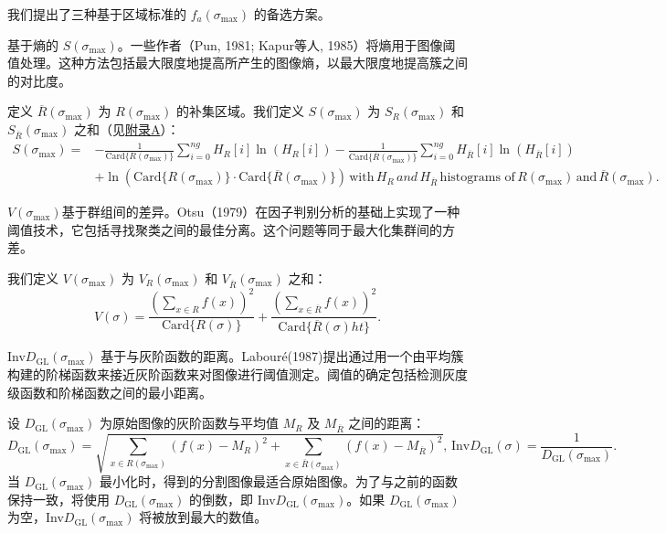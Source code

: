 我们提出了三种基于区域标准的 $f_{a}(\sigma_{\text{max}})$ 的备选方案。

基于熵的 $S(\sigma_{\text{max}})$。一些作者（Pun, 1981\cite{pun1981entropic}; Kapur等人, 1985\cite{kapur1985new}）将熵用于图像阈值处理。这种方法包括最大限度地提高所产生的图像熵，以最大限度地提高簇之间的对比度。

定义 $\overline{R}(\sigma_{\text{max}})$ 为 $R(\sigma_{\text{max}})$ 的补集区域。我们定义 $S(\sigma_{\text{max}})$ 为 $S_{R}(\sigma_{\text{max}})$ 和 $S_{\overline{R}}(\sigma_{\text{max}})$ 之和（见\hyperref[sec:appendix_a]{附录A}）：
\begin{equation}
    \begin{aligned}
    S(\sigma_{\text{max}}) = & - \frac{1}{\text{Card}\{R(\sigma_{\text{max}})\}} \sum_{i=0}^{ng}H_R[i]\ln(H_R[i])
                               - \frac{1}{\text{Card}\{\overline{R}(\sigma_{\text{max}})\}} \sum_{i=0}^{ng}H_{\overline{R}}[i]\ln(H_{\overline{R}}[i]) \\
                             & + \ln(\text{Card}\{R(\sigma_{\text{max}})\} \cdot \text{Card}\{\overline{R}(\sigma_{\text{max}})\})
                               \, \text{with} \, H_R \, and \, H_{\overline{R}} \, \text{histograms of} \, R(\sigma_{\text{max}}) \, \text{and} \, \overline{R}(\sigma_{\text{max}}).
    \end{aligned}
\end{equation}

$V(\sigma_{\text{max}})$基于群组间的差异。Otsu（1979）\cite{otsu1979threshold}在因子判别分析的基础上实现了一种阈值技术，它包括寻找聚类之间的最佳分离。这个问题等同于最大化集群间的方差。

我们定义 $V(\sigma_{\text{max}})$ 为 $V_{R}(\sigma_{\text{max}})$ 和 $V_{\overline{R}}(\sigma_{\text{max}})$ 之和：
\begin{equation}
    V(\sigma)=\frac{(\sum_{x \in R}f(x))^2}{\text{Card}\{R(\sigma)\}}+\frac{(\sum_{x \in \overline{R}}f(x))^2}{\text{Card}\{\overline{R}(\sigma)ht\}}.
\end{equation}

Inv$D_{\text{GL}}(\sigma_{\text{max}})$ 基于与灰阶函数的距离。Labouré(1987)\cite{laboure1987feasibility}提出通过用一个由平均簇构建的阶梯函数来接近灰阶函数来对图像进行阈值测定。阈值的确定包括检测灰度级函数和阶梯函数之间的最小距离。

设 $D_{\text{GL}}(\sigma_{\text{max}})$ 为原始图像的灰阶函数与平均值 $M_R$ 及 $M_{\overline{R}}$ 之间的距离：
\begin{equation}
    D_{\text{GL}}(\sigma_{\text{max}})=\sqrt{
        \sum_{x \in R(\sigma_{\text{max}})} (f(x)-M_R)^2
        +
        \sum_{x \in \overline{R}(\sigma_{\text{max}})} (f(x)-M_{\overline{R}})^2
    }
    ,\,
    \text{Inv}D_{\text{GL}}(\sigma)=\frac{1}{D_{\text{GL}}(\sigma_{\text{max}})}
    .
\end{equation}
当 $D_{\text{GL}}(\sigma_{\text{max}})$ 最小化时，得到的分割图像最适合原始图像。为了与之前的函数保持一致，将使用 $D_{\text{GL}}(\sigma_{\text{max}})$ 的倒数，即 Inv$D_{\text{GL}}(\sigma_{\text{max}})$。如果 $D_{\text{GL}}(\sigma_{\text{max}})$ 为空，Inv$D_{\text{GL}}(\sigma_{\text{max}})$ 将被放到最大的数值。

